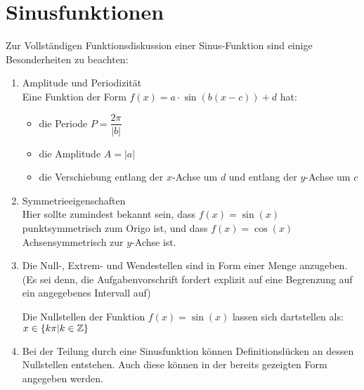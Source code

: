 \section{Sinusfunktionen}
Zur Vollständigen Funktionsdiskussion einer Sinus-Funktion sind einige Besonderheiten zu beachten:
\begin{enumerate}
  \item Amplitude und Periodizität\\
  Eine Funktion der Form $f(x)=a\cdot\sin(b(x-c))+d$ hat:
  \begin{itemize}
    \item die Periode $P = \dfrac{2\pi}{|b|}$
    \item die Amplitude $A = |a|$
    \item die Verschiebung entlang der $x$-Achse um $d$ und entlang der $y$-Achse um $c$
    \end{itemize}
  \item Symmetrieeigenschaften\\
  Hier sollte zumindest bekannt sein, dass $f(x)=\sin(x)$ punktsymmetrisch zum Origo ist, und dass $f(x)=\cos(x)$ Achsensymmetrisch zur $y$-Achse ist.
  \item Die Null-, Extrem- und Wendestellen sind in Form einer Menge anzugeben. (Es sei denn, die Aufgabenvorschrift fordert explizit auf eine Begrenzung auf ein angegebenes Intervall auf)\\
  \begin{Beispiel}
    Die Nullstellen der Funktion $f(x)=\sin(x)$ lassen sich dartstellen als: $x \in \{k\pi|k \in \mathbb{Z}\}$
  \end{Beispiel}
  \item Bei der Teilung durch eine Sinusfunktion können Definitionslücken an dessen Nullstellen entstehen. Auch diese können in der bereits gezeigten Form angegeben werden.
  \end{enumerate}
